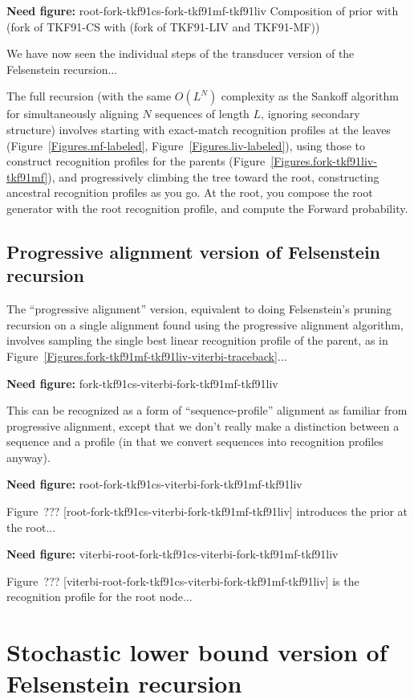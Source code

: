 \documentclass{article}
\newcommand{\figref}[1]{Figure~\ref{Figures.#1}}
\newcommand{\needfig}[1]{{\bf Need figure: } #1 }
\newcommand{\needfigref}[1]{Figure~??? [#1] }
\begin{document}
\needfig{root-fork-tkf91cs-fork-tkf91mf-tkf91liv
 Composition of prior with (fork of TKF91-CS with (fork of TKF91-LIV and TKF91-MF))}

We have now seen the individual steps of the transducer version of the Felsenstein recursion...

The full recursion (with the same $O(L^N)$ complexity as the Sankoff algorithm
for simultaneously aligning $N$ sequences of length $L$, ignoring secondary structure)
involves starting with exact-match recognition profiles at the leaves (\figref{mf-labeled}, \figref{liv-labeled}),
using those to construct recognition profiles for the parents (\figref{fork-tkf91liv-tkf91mf}),
and progressively climbing the tree toward the root,
constructing ancestral recognition profiles as you go.
At the root, you compose the root generator with the root recognition profile,
and compute the Forward probability.

\subsection{Progressive alignment version of Felsenstein recursion}

The ``progressive alignment'' version,
equivalent to doing Felsenstein's pruning recursion on a single alignment
found using the progressive alignment algorithm,
involves sampling the single best linear recognition profile of the parent,
as in \figref{fork-tkf91mf-tkf91liv-viterbi-traceback}...

\needfig{fork-tkf91cs-viterbi-fork-tkf91mf-tkf91liv}

This can be recognized as a form of ``sequence-profile'' alignment as familiar from progressive alignment,
except that we don't really make a distinction between a sequence and a profile
(in that we convert sequences into recognition profiles anyway).

\needfig{root-fork-tkf91cs-viterbi-fork-tkf91mf-tkf91liv}

\needfigref{root-fork-tkf91cs-viterbi-fork-tkf91mf-tkf91liv} introduces the prior at the root...

\needfig{viterbi-root-fork-tkf91cs-viterbi-fork-tkf91mf-tkf91liv}

\needfigref{viterbi-root-fork-tkf91cs-viterbi-fork-tkf91mf-tkf91liv} is the recognition profile for the root node...

\section{Stochastic lower bound version of Felsenstein recursion}
\end{document}
